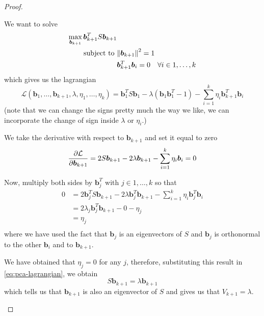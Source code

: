 \documentclass[12pt]{extarticle}
\renewcommand{\vec}[1]{\bm{#1}}
\begin{document}
\begin{proof}
{\begin{description}
				      We want to solve
				      \begin{align}
					      \max_{\vec b_{k+1}}  \vec b_{k+1}^T S \vec b_{k+1} &                                                             \\
					      \text{subject to }                                 & \norm{\vec b_{k+1}}^2 = 1                                   \\
					                                                         & \vec b_{k+1}^T \vec b_i = 0 \quad \forall i \in 1, \dots, k
				      \end{align}
				      which gives us the lagrangian
				      \begin{equation}
					      \mathcal L(\vec b_1,\dots, \vec b_{k+1}, \lambda, \eta_1, \dots, \eta_k)
					      = \vec b_1^T S \vec b_1 - \lambda(\vec b_1 \vec b_1^T -1)
					      - \sum_{i = 1}^k \eta_i \vec b_{k+1}^T \vec b_i
				      \end{equation}
				      (note that we can change the signs pretty much the way we like,
				      we can incorporate the change of sign inside $\lambda$ or $\eta_i$.)

				      We take the derivative with respect to $\vec b_{k+1}$ and set it equal to zero
				      \begin{equation}
					      \pdv{\mathcal L}{\vec b_{k+1}} = 2 S \vec b_{k+1} - 2 \lambda \vec b_{k+1}
					      - \sum_{i = 1}^k \eta_i \vec b_i = 0
					      \label{eq:pca-lagrangian}
				      \end{equation}

				      Now, multiply both sides by $\vec b_j^T$ with $j \in 1, \dots, k$ so that
				      \begin{align}
					      0 & = 2 \vec b_j^T S \vec b_{k+1} - 2 \lambda \vec b_j^T \vec b_{k+1} - \sum_{i = 1}^k \eta_i \vec b_j^T \vec b_i \\
					        & = 2 \lambda_j \vec b_j^T \vec b_{k+1} - 0 - \eta_j                                                            \\
					        & = \eta_j                                                                                                      \\
				      \end{align}
				      where we have used the fact that $\vec b_j$ is an eigenvectors of $S$ and $\vec b_j$
				      is orthonormal to the other $\vec b_i$ and to $\vec b_{k+1}$.

				      We have obtained that $\eta_j = 0$ for any $j$, therefore, substituting this result
				      in \cref{eq:pca-lagrangian}, we obtain
				      \begin{equation}
					      S \vec b_{k+1} = \lambda \vec b_{k+1}
				      \end{equation}
				      which tells us that $\vec b_{k+1}$ is also an eigenvector of $S$ and gives us that
				      $V_{k+1} = \lambda$.
				      \qedhere
			\end{description}
		}
\end{proof}
\end{document}
